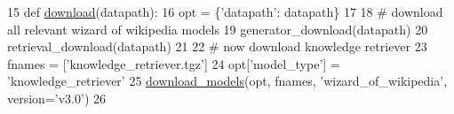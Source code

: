\begin{DoxyCode}
15 \textcolor{keyword}{def }\hyperlink{namespaceparlai_1_1zoo_1_1wizard__of__wikipedia_1_1knowledge__retriever_a106476a619c671f1333e4de41ee883b6}{download}(datapath):
16     opt = \{\textcolor{stringliteral}{'datapath'}: datapath\}
17 
18     \textcolor{comment}{# download all relevant wizard of wikipedia models}
19     generator\_download(datapath)
20     retrieval\_download(datapath)
21 
22     \textcolor{comment}{# now download knowledge retriever}
23     fnames = [\textcolor{stringliteral}{'knowledge\_retriever.tgz'}]
24     opt[\textcolor{stringliteral}{'model\_type'}] = \textcolor{stringliteral}{'knowledge\_retriever'}
25     \hyperlink{namespaceparlai_1_1core_1_1build__data_ab697f23f05d3e36d7979fe5e0ed7911e}{download\_models}(opt, fnames, \textcolor{stringliteral}{'wizard\_of\_wikipedia'}, version=\textcolor{stringliteral}{'v3.0'})
26 \end{DoxyCode}
